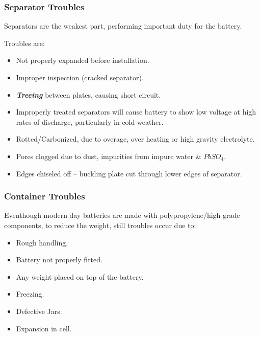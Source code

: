 \documentclass{beamer}
\begin{document}
\begin{frame}     %
  \frametitle{Separator Troubles}
  \fontsize{8pt}{14}\selectfont
  \begin{center}
    Separators are the weakest part, performing important duty for the battery.
  \end{center}
  
  Troubles are:
  \begin{itemize}
    \item Not properly expanded before installation.
    \item Improper inspection (cracked separator).
    \item \textbf{\textit{Treeing}} between plates, causing short circuit.
    \item Improperly treated separators will cause battery to show low voltage at high rates of discharge, particularly in cold weather.
    \item Rotted/Carbonized, due to overage, over heating or high gravity electrolyte.
    \item Pores clogged due to dust, impurities from impure water \& $PbSO_{4}$.
    \item Edges chiseled off -- buckling plate cut through lower edges of separator.
  \end{itemize}
\end{frame}

\begin{frame}     %
  \frametitle{Container Troubles}
  \fontsize{8pt}{14}\selectfont
  \begin{center}
    Eventhough modern day batteries are made with polypropylene/high grade components, to reduce the weight, still troubles occur due to:
  \end{center}
  
  \begin{itemize}
    \item Rough handling.
    \item Battery not properly fitted.
    \item Any weight placed on top of the battery.
    \item Freezing.
    \item Defective Jars.
    \item Expansion in cell.
  \end{itemize}
\end{frame}
\end{document}
